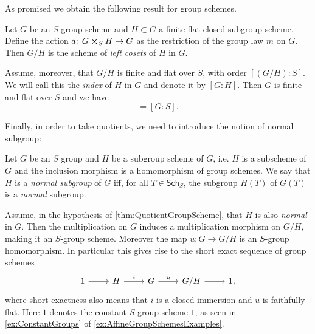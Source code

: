 \noindent
As promised we obtain the following result for group schemes.
\begin{prop}\label{thm:QuotientGroupScheme}
	Let $G$ be an $S$-group scheme and $H \subset G$ a finite flat closed
	subgroup scheme.
	Define the action $a\colon G \cross_{ S } H \to G$ as the restriction of the
	group law $m$ on $G$.
	Then $G/H$ is the scheme of {\em left cosets} of $H$ in $G$.

	Assume, moreover, that $G/H$ is finite and flat over $S$,
	with order $[(G/H):S]$. We will call this the {\em index} of $H$ in $G$
	and denote it by $[G:H]$.
	Then $G$ is finite and flat over $S$ and we have
	\begin{equation*}
		[G:H][H:S] = [G:S]
	.\end{equation*} 
\end{prop}


\noindent
Finally, in order to take quotients, we need to introduce the notion
of normal subgroup:
\begin{defn}
	Let $G$ be an $S$ group and $H$ be a subgroup scheme of $G$,
	i.e. $H$ is a subscheme of $G$ and the inclusion morphism
	is a homomorphism of group schemes.
	We say that $H$ is a {\em normal subgroup} of $G$ iff, for all $T \in \mathsf{Sch}_{ S }$,
	the subgroup $H(T)$ of $G(T)$ is a {\em normal} subgroup.
\end{defn}


\begin{rem}
	Assume, in the hypothesis of \cref{thm:QuotientGroupScheme}, that $H$ is
	also {\em normal} in $G$.
	Then the multiplication on $G$ induces a multiplication 
	morphism on $G/H$, making it an $S$-group scheme.
	Moreover the map $u\colon G \to G/H$ is
	an $S$-group homomorphism.
	In particular this gives rise to the short exact sequence of group schemes
	\begin{equation*}
	\begin{tikzcd}
		1 \arrow[r, "", rightarrow] &
		H \arrow[r, "i", rightarrow] &
		G \arrow[r, "u", rightarrow] &
		G/H \arrow[r, "", rightarrow] &
		1
	,\end{tikzcd}
	\end{equation*}
	where short exactness also means that $i$ is a closed immersion
	and $u$ is faithfully flat.
	Here $1$ denotes the constant $S$-group scheme $1$, as
	seen in \cref{ex:ConstantGroups} of
	\cref{ex:AffineGroupSchemesExamples}.
\end{rem}



